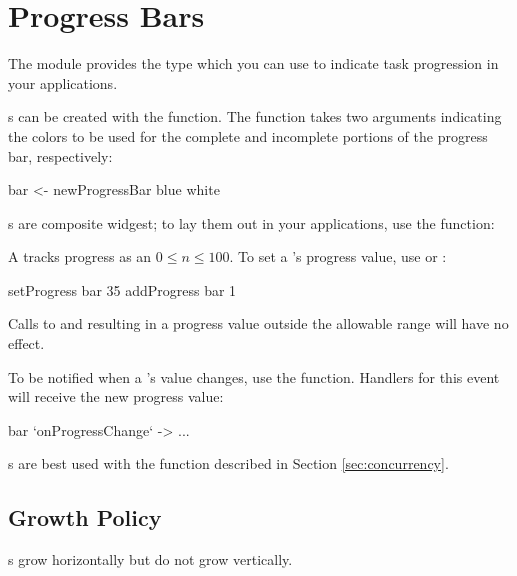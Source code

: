 \section{Progress Bars}
\label{sec:progress_bars}

The  module provides the  type which
you can use to indicate task progression in your applications.

s can be created with the 
function.  The function takes two  arguments indicating the
colors to be used for the complete and incomplete portions of the
progress bar, respectively:

\begin{haskellcode}
 bar <- newProgressBar blue white
\end{haskellcode}

s are composite widgest; to lay them out in your
applications, use the  function:


A  tracks progress as an  $0 \le n $.
To set a 's progress value, use  or
:

\begin{haskellcode}
 setProgress bar 35
 addProgress bar 1
\end{haskellcode}

Calls to  and  resulting in a progress
value outside the allowable range will have no effect.

To be notified when a 's value changes, use the
 function.  Handlers for this event will receive
the new progress value:

\begin{haskellcode}
 bar `onProgressChange` \newVal -> ...
\end{haskellcode}

s are best used with the  function
described in Section \ref{sec:concurrency}.

\subsection{Growth Policy}

s grow horizontally but do not grow vertically.
